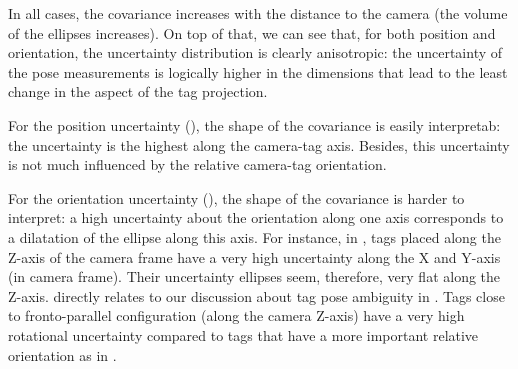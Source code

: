 In all cases, the covariance increases with the distance to the camera (the volume of the ellipses increases).
On top of that, we can see that, for both position and orientation, the uncertainty distribution is clearly anisotropic: 
the uncertainty of the pose measurements is logically higher in the dimensions that lead to the least change in the aspect of the tag projection. 

For the position uncertainty (), the shape of the covariance is easily interpretab: the uncertainty is the highest along the camera-tag axis.
Besides, this uncertainty is not much influenced by the relative camera-tag orientation. 

For the orientation uncertainty (), the shape of the covariance is harder to interpret: a high uncertainty about the orientation along 
one axis corresponds to a dilatation of the ellipse along this axis. For instance, in , tags placed
along the Z-axis of the camera frame have a very high uncertainty along the X and Y-axis (in camera frame). Their uncertainty ellipses seem, therefore, very flat
along the Z-axis.  directly relates to our discussion about tag pose ambiguity in . Tags close
to fronto-parallel configuration (along the camera Z-axis) have a very high rotational uncertainty compared to tags that have a more important relative 
orientation as in .


